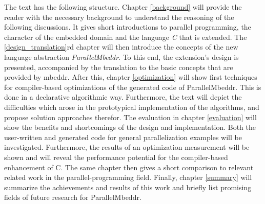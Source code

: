 The text has the following structure. Chapter \ref{background} will provide the reader with the necessary background to understand the reasoning of the following discussions. It gives short introductions to parallel programming, the character of the embedded domain and the language \textit{C} that is extended. The \ref{design_translation}rd chapter  will then introduce the concepts of the new language abstraction \textit{ParallelMbeddr}. To this end, the extension's design is presented, accompanied by the translation to the basic concepts that are provided by mbeddr. After this, chapter \ref{optimization} will show first techniques for compiler-based optimizations of the generated code of ParallelMbeddr. This is done in a declarative algorithmic way. Furthermore, the text will depict the difficulties which arose in the prototypical implementation of the algorithms, and propose solution approaches therefor. The evaluation in chapter \ref{evaluation} will show the benefits and shortcomings of the design and implementation. Both the user-written and generated code for general parallelization examples will be investigated. Furthermore, the results of an optimization measurement will be shown and will reveal the performance potential for the compiler-based enhancement of C. The same chapter then gives a short comparison to relevant related work in the parallel-programming field.
Finally, chapter \ref{summary} will summarize the achievements and results of this work and briefly list promising fields of future research for ParallelMbeddr.
